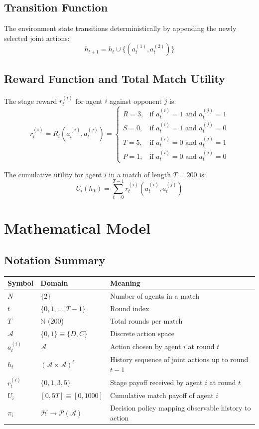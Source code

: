 ﻿\documentclass[11pt,a4paper]{article}
\begin{document}
\subsection{Transition Function}
The environment state transitions deterministically by appending the newly selected joint actions:
\[
h_{t+1} = h_t \cup \{(a_t^{(1)}, a_t^{(2)})\}
\]

\subsection{Reward Function and Total Match Utility}
The stage reward $r_t^{(i)}$ for agent $i$ against opponent $j$ is:
\[
r_t^{(i)} = R_i(a_t^{(i)}, a_t^{(j)}) =
\begin{cases}
R = 3, & \text{if } a_t^{(i)} = 1 \text{ and } a_t^{(j)} = 1 \\
S = 0, & \text{if } a_t^{(i)} = 1 \text{ and } a_t^{(j)} = 0 \\
T = 5, & \text{if } a_t^{(i)} = 0 \text{ and } a_t^{(j)} = 1 \\
P = 1, & \text{if } a_t^{(i)} = 0 \text{ and } a_t^{(j)} = 0
\end{cases}
\]

The cumulative utility for agent $i$ in a match of length $T = 200$ is:
\[
U_i(h_T) = \sum_{t=0}^{T-1} r_t^{(i)}(a_t^{(i)}, a_t^{(j)})
\]


\section{Mathematical Model}

\subsection{Notation Summary}

\begin{tabularx}{\textwidth}{llX}
\toprule
\textbf{Symbol} & \textbf{Domain} & \textbf{Meaning} \\
\midrule
$N$ & $\{2\}$ & Number of agents in a match \\
$t$ & $\{0, 1, \dots, T-1\}$ & Round index \\
$T$ & $\mathbb{N}$ ($200$) & Total rounds per match \\
$\mathcal{A}$ & $\{0, 1\} \equiv \{D, C\}$ & Discrete action space \\
$a_t^{(i)}$ & $\mathcal{A}$ & Action chosen by agent $i$ at round $t$ \\
$h_t$ & $(\mathcal{A} \times \mathcal{A})^t$ & History sequence of joint actions up to round $t-1$ \\
$r_t^{(i)}$ & $\{0, 1, 3, 5\}$ & Stage payoff received by agent $i$ at round $t$ \\
$U_i$ & $[0, 5T] \equiv [0, 1000]$ & Cumulative match payoff of agent $i$ \\
$\pi_i$ & $\mathcal{H} \to \mathcal{P}(\mathcal{A})$ & Decision policy mapping observable history to action \\
\bottomrule
\end{tabularx}
\end{document}

